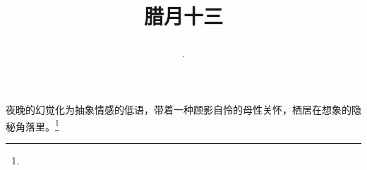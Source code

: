\title{\date[d=23,m=1,y=2024][year:cn-y,年,month:cn,day:cn,日,·,weekday]·腊月十三 }
夜晚的幻觉化为抽象情感的低语，带着一种顾影自怜的母性关怀，栖居在想象的隐秘角落里。\footnote{ }


